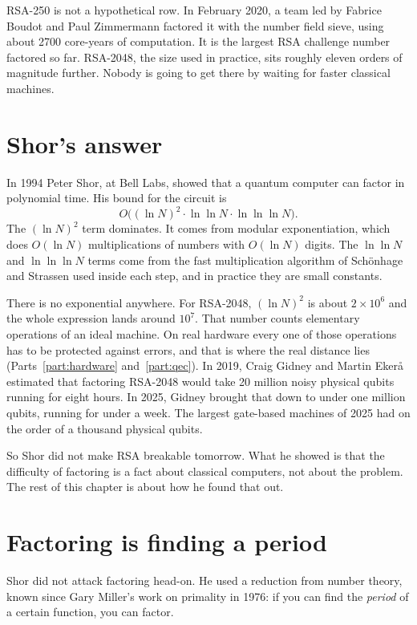 RSA-250 is not a hypothetical row. In February 2020, a team led by Fabrice
Boudot and Paul Zimmermann factored it with the number field sieve, using about
2700 core-years of computation. It is the largest RSA challenge number
factored so far. RSA-2048, the size used in practice, sits roughly eleven orders
of magnitude further. Nobody is going to get there by waiting for faster
classical machines.

\section{Shor's answer}

In 1994 Peter Shor, at Bell Labs, showed that a quantum computer can factor in
polynomial time. His bound for the circuit is
\[
  O\!\big((\ln N)^2 \cdot \ln\ln N \cdot \ln\ln\ln N\big).
\]
The $(\ln N)^2$ term dominates. It comes from modular exponentiation, which
does $O(\ln N)$ multiplications of numbers with $O(\ln N)$ digits. The
$\ln\ln N$ and $\ln\ln\ln N$ terms come from the fast multiplication algorithm
of Schönhage and Strassen used inside each step, and in practice they are small
constants.

There is no exponential anywhere. For RSA-2048, $(\ln N)^2$ is about
$2\times10^{6}$ and the whole expression lands around $10^{7}$. That number counts
elementary operations of an ideal machine. On real hardware every one of those
operations has to be protected against errors, and that is where the real
distance lies (Parts~\ref{part:hardware} and~\ref{part:qec}). In 2019, Craig Gidney and Martin Ekerå
estimated that factoring RSA-2048 would take 20 million noisy physical qubits
running for eight hours. In 2025, Gidney brought that down to under one million
qubits, running for under a week. The largest gate-based machines of 2025 had
on the order of a thousand physical qubits.

So Shor did not make RSA breakable tomorrow. What he showed is that the
difficulty of factoring is a fact about classical computers, not about the
problem. The rest of this chapter is about how he found that out.

\section{Factoring is finding a period}

Shor did not attack factoring head-on. He used a reduction from number theory,
known since Gary Miller's work on primality in 1976: if you can find the
\emph{period} of a certain function, you can factor.

